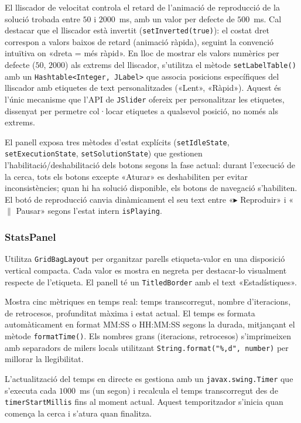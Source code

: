 \documentclass[conference,compsoc]{IEEEtran}
\begin{document}
El lliscador de velocitat controla el retard de l'animació de reproducció
de la solució trobada entre $50$
i $2000$~ms, amb un valor per defecte de $500$~ms. Cal destacar que el
lliscador està invertit (\texttt{setInverted(true)}): el costat dret
correspon a valors baixos de retard (animació ràpida), seguint la
convenció intuïtiva on «dreta = més ràpid». En lloc de mostrar els valors numèrics per defecte ($50$, $2000$) als
extrems del lliscador, s'utilitza el mètode \texttt{setLabelTable()} amb
un \texttt{Hashtable<Integer, JLabel>} que associa posicions específiques
del lliscador amb etiquetes de text personalitzades («Lent», «Ràpid»).
Aquest és l'únic mecanisme que l'API de \texttt{JSlider} ofereix per
personalitzar les etiquetes, dissenyat per permetre col·locar etiquetes
a qualsevol posició, no només als extrems.

El panell exposa tres mètodes d'estat explícits (\texttt{setIdleState},
\texttt{setExecutionState}, \texttt{setSolutionState}) que gestionen
l'habilitació/deshabilitació dels botons segons la fase actual:
durant l'execució de la cerca, tots els botons excepte «Aturar» es
deshabiliten per evitar inconsistències; quan hi ha solució disponible,
els botons de navegació s'habiliten. El botó de reproducció canvia
dinàmicament el seu text entre «$\blacktriangleright$ Reproduir» i
«$\parallel$ Pausar» segons l'estat intern \texttt{isPlaying}.

\subsubsection{StatsPanel}

Utilitza \texttt{GridBagLayout} per organitzar parells etiqueta-valor
en una disposició vertical compacta. Cada valor es mostra en negreta
per destacar-lo visualment respecte de l'etiqueta.
El panell té un \texttt{TitledBorder} amb el text «Estadístiques».

Mostra cinc mètriques en temps real: temps transcorregut, nombre
d'iteracions, de retrocesos, profunditat màxima i estat actual. El
temps es formata automàticament en format MM:SS o HH:MM:SS segons la
durada, mitjançant el mètode \texttt{formatTime()}. Els nombres grans
(iteracions, retrocesos) s'imprimeixen amb separadors de milers locals
utilitzant \texttt{String.format("\%,d", number)} per millorar la
llegibilitat.

L'actualització del temps en directe es gestiona amb un
\texttt{javax.swing.Timer} que s'executa cada $1000$~ms (un segon) i
recalcula el temps transcorregut des de \texttt{timerStartMillis} fins
al moment actual. Aquest temporitzador s'inicia quan comença la cerca
i s'atura quan finalitza.
\end{document}
